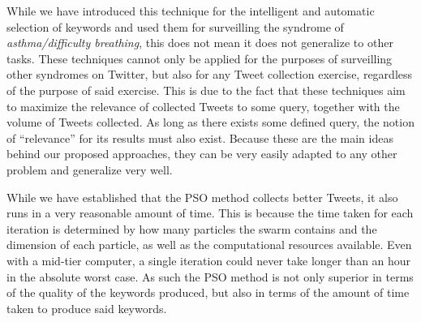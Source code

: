 \documentclass[runningheads]{llncs}
\begin{document}
While we have introduced this technique for the intelligent and automatic selection of keywords and used them for surveilling the syndrome of \textit{asthma/difficulty breathing}, this does not mean it does not generalize to other tasks. These techniques cannot only be applied for the purposes of surveilling other syndromes on Twitter, but also for any Tweet collection exercise, regardless of the purpose of said exercise. This is due to the fact that these techniques aim to maximize the relevance of collected Tweets to some query, together with the volume of Tweets collected. As long as there exists some defined query, the notion of ``relevance'' for its results must also exist. Because these are the main ideas behind our proposed approaches, they can be very easily adapted to any other problem and generalize very well.

While we have established that the PSO method collects better Tweets, it also runs in a very reasonable amount of time. This is because the time taken for each iteration is determined by how many particles the swarm contains and the dimension of each particle, as well as the computational resources available. Even with a mid-tier computer, a single iteration could never take longer than an hour in the absolute worst case. As such the PSO method is not only superior in terms of the quality of the keywords produced, but also in terms of the amount of time taken to produce said keywords.
%
%
%


\end{document}
